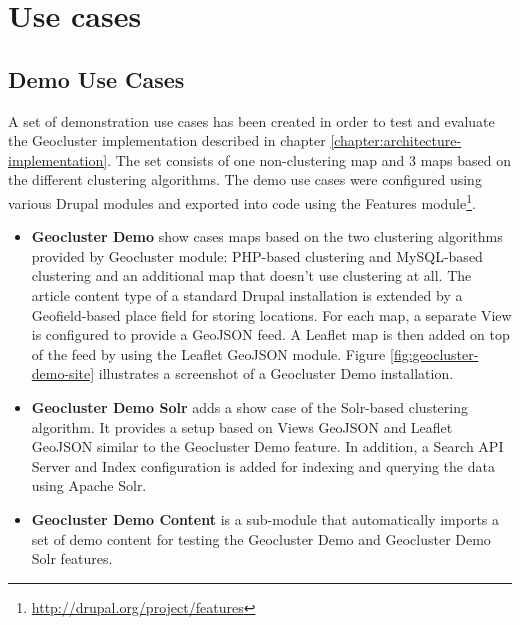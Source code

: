 %
%

\chapter{Use cases}
\label{chapter:use-cases}

\section{Demo Use Cases}
\label{chapter:use-case-demo}

A set of demonstration use cases has been created in order to test and evaluate the Geocluster implementation described in chapter \ref{chapter:architecture-implementation}. The set consists of one non-clustering map and 3 maps based on the different clustering algorithms. The demo use cases were configured using various Drupal modules and exported into code using the Features module\footnote{\url{http://drupal.org/project/features}}.

\begin{itemize}

\item \textbf{Geocluster Demo} show cases maps based on the two clustering algorithms provided by Geocluster module: PHP-based clustering and MySQL-based clustering and an additional map that doesn't use clustering at all. The article content type of a standard Drupal installation is extended by a Geofield-based place field for storing locations. For each map, a separate View is configured to provide a GeoJSON feed. A Leaflet map is then added on top of the feed by using the Leaflet GeoJSON module. Figure \ref{fig:geocluster-demo-site} illustrates a screenshot of a Geocluster Demo installation.

\item \textbf{Geocluster Demo Solr} adds a show case of the Solr-based clustering algorithm. It provides a setup based on Views GeoJSON and Leaflet GeoJSON similar to the Geocluster Demo feature. In addition, a Search API Server and Index configuration is added for indexing and querying the data using Apache Solr.  

\item \textbf{Geocluster Demo Content} is a sub-module that automatically imports a set of demo content for testing the Geocluster Demo and Geocluster Demo Solr features.

\end{itemize}

